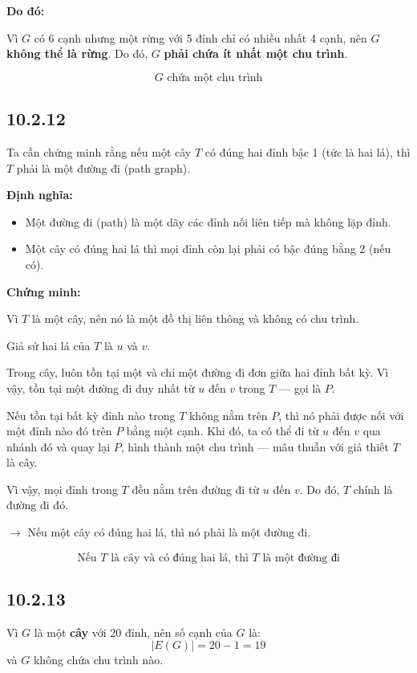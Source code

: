 \documentclass{article}
\begin{document}
	\vspace{1em}
	\noindent \textbf{Do đó:}  
	
	Vì $G$ có 6 cạnh nhưng một rừng với 5 đỉnh chỉ có nhiều nhất 4 cạnh, nên $G$ \textbf{không thể là rừng}.  
	Do đó, $G$ \textbf{phải chứa ít nhất một chu trình}.
	
	\[
	\boxed{G \text{ chứa một chu trình}}
	\]
	
	\subsection*{10.2.12}
	Ta cần chứng minh rằng nếu một cây $T$ có đúng hai đỉnh bậc 1 (tức là hai lá), thì $T$ phải là một đường đi (path graph).
	
	\textbf{Định nghĩa:}
	\begin{itemize}
		\item Một đường đi (path) là một dãy các đỉnh nối liên tiếp mà không lặp đỉnh.
		\item Một cây có đúng hai lá thì mọi đỉnh còn lại phải có bậc đúng bằng 2 (nếu có).
	\end{itemize}
	
	\noindent \textbf{Chứng minh:}
	
	Vì $T$ là một cây, nên nó là một đồ thị liên thông và không có chu trình.
	
	Giả sử hai lá của $T$ là $u$ và $v$.
	
	Trong cây, luôn tồn tại một và chỉ một đường đi đơn giữa hai đỉnh bất kỳ. Vì vậy, tồn tại một đường đi duy nhất từ $u$ đến $v$ trong $T$ — gọi là $P$.
	
	Nếu tồn tại bất kỳ đỉnh nào trong $T$ không nằm trên $P$, thì nó phải được nối với một đỉnh nào đó trên $P$ bằng một cạnh. Khi đó, ta có thể đi từ $u$ đến $v$ qua nhánh đó và quay lại $P$, hình thành một chu trình — mâu thuẫn với giả thiết $T$ là cây.
	
	Vì vậy, mọi đỉnh trong $T$ đều nằm trên đường đi từ $u$ đến $v$. Do đó, $T$ chính là đường đi đó.
	
	$\rightarrow$ Nếu một cây có đúng hai lá, thì nó phải là một đường đi.
	
	\[
	\boxed{\text{Nếu } T \text{ là cây và có đúng hai lá, thì } T \text{ là một đường đi}}
	\]
	
	\subsection*{10.2.13}
	Vì $G$ là một \textbf{cây} với 20 đỉnh, nên số cạnh của $G$ là:
	\[
	|E(G)| = 20 - 1 = 19
	\]
	và $G$ không chứa chu trình nào.
	
\end{document}
